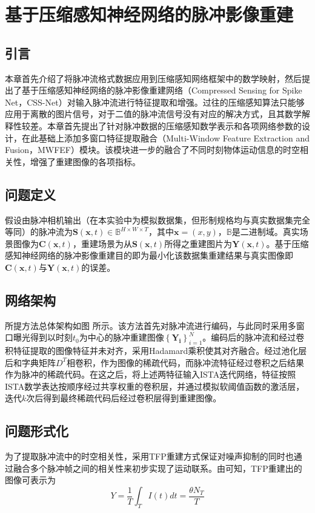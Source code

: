 \chapter{基于压缩感知神经网络的脉冲影像重建}

\section{引言}
本章首先介绍了将脉冲流格式数据应用到压缩感知网络框架中的数学映射，然后提出了基于压缩感知神经网络的脉冲影像重建网络（Compressed Sensing for Spike Net，CSS-Net）对输入脉冲流进行特征提取和增强。过往的压缩感知算法只能够应用于离散的图片信号，对于二值的脉冲流信号没有对应的解决方式，且其数学解释性较差。本章首先提出了针对脉冲数据的压缩感知数学表示和各项网络参数的设计，在此基础上添加多窗口特征提取融合（Multi-Window Feature Extraction and Fusion，MWFEF）模块。该模块进一步的融合了不同时刻物体运动信息的时空相关性，增强了重建图像的各项指标。

\section{问题定义}
假设由脉冲相机输出（在本实验中为模拟数据集，但形制规格均与真实数据集完全等同）的脉冲流为$\boldsymbol{S}(\boldsymbol{x},t) \in \mathbb{B}^{H \times W \times T}$，其中$\boldsymbol{x} = (x,y)$，$\mathbb{B}$是二进制域。真实场景图像为$\boldsymbol{C}(\boldsymbol{x},t) $，重建场景为从$\boldsymbol{S}(\boldsymbol{x},t)$所得之重建图片为$\boldsymbol{Y}(\boldsymbol{x},t)$。基于压缩感知神经网络的脉冲影像重建目的即为最小化该数据集重建结果与真实图像即$\boldsymbol{C}(\boldsymbol{x},t) $与$\boldsymbol{Y}(\boldsymbol{x},t)$的误差。

\section{网络架构}
所提方法总体架构如图   所示。该方法首先对脉冲流进行编码，与此同时采用多窗口曝光得到以时刻$t_0$为中心的脉冲重建图像$\left\{ \boldsymbol{Y_i} \right\}_{i=1}^{N}$。编码后的脉冲流和经过卷积特征提取的图像特征并未对齐，采用Hadamard乘积使其对齐融合。经过池化层后和字典矩阵$D^T$相卷积，作为图像的稀疏代码，而脉冲流特征经过卷积之后结果作为脉冲的稀疏代码。在这之后，将上述两特征输入ISTA迭代网络，特征按照ISTA数学表达按顺序经过共享权重的卷积层，并通过模拟软阈值函数的激活层，迭代$k$次后得到最终稀疏代码后经过卷积层得到重建图像。

\section{问题形式化}
为了提取脉冲流中的时空相关性，采用TFP重建方式保证对噪声抑制的同时也通过融合多个脉冲帧之间的相关性来初步实现了运动联系。由\cite{TFP_TFI}可知，TFP重建出的图像可表示为
\begin{equation}
    Y = \frac{1}{T} \int_{T}^{} I(t)dt = \frac{\theta N_T}{T}
    \label{eq:TFP}
\end{equation}

